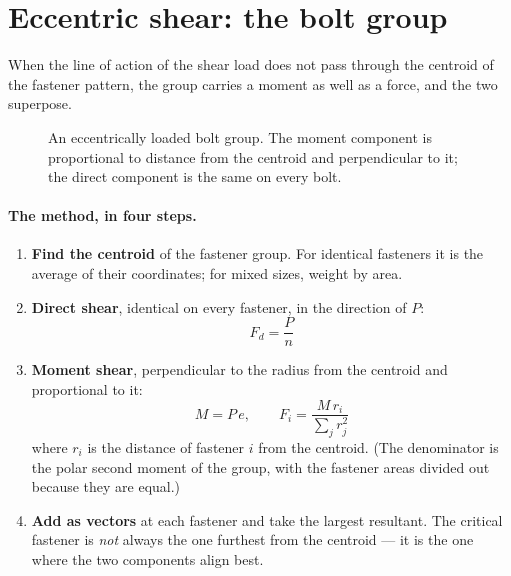 \documentclass[11pt,a4paper]{article}
\begin{document}
\section{Eccentric shear: the bolt group}
\label{sec:group}

When the line of action of the shear load does not pass through the centroid of the fastener
pattern, the group carries a moment as well as a force, and the two superpose.

\begin{figure}[H]\centering
\resizebox{0.94\textwidth}{!}{}
\caption{An eccentrically loaded bolt group. The moment component is proportional to distance from
the centroid and perpendicular to it; the direct component is the same on every bolt.}
\label{fig:group}
\end{figure}

\paragraph{The method, in four steps.}
\begin{enumerate}[leftmargin=*,itemsep=2pt]
\item \textbf{Find the centroid} of the fastener group. For identical fasteners it is the average
  of their coordinates; for mixed sizes, weight by area.
\item \textbf{Direct shear}, identical on every fastener, in the direction of $P$:
  \[ F_d = \frac{P}{n} \]
\item \textbf{Moment shear}, perpendicular to the radius from the centroid and proportional to it:
  \[ M = P\,e, \qquad F_i = \frac{M\,r_i}{\sum_j r_j^{2}} \]
  where $r_i$ is the distance of fastener $i$ from the centroid. (The denominator is the polar
  second moment of the group, with the fastener areas divided out because they are equal.)
\item \textbf{Add as vectors} at each fastener and take the largest resultant. The critical
  fastener is \emph{not} always the one furthest from the centroid --- it is the one where the two
  components align best.
\end{enumerate}
\end{document}
